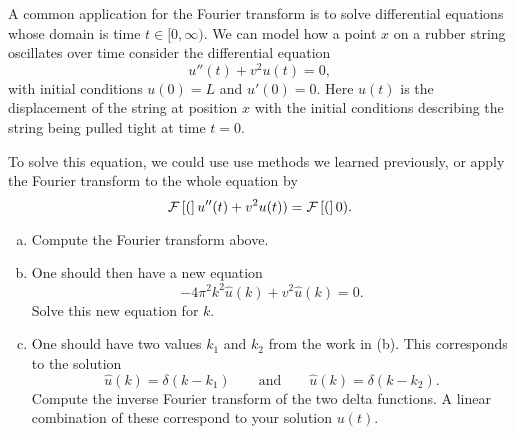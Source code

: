 \documentclass[12pt]{article} %
\begin{document}
%

\begin{problem}
A common application for the Fourier transform is to solve differential equations whose domain is time $t\in [0,\infty)$. We can model how a point $x$ on a rubber string oscillates over time consider the differential equation
\[
u''(t)+v^2u(t)=0,
\]
with initial conditions $u(0)=L$ and $u'(0)=0$. Here $u(t)$ is the displacement of the string at position $x$ with the initial conditions describing the string being pulled tight at time $t=0$.
\begin{figure}[H]
	\centering
	\def\svgwidth{\columnwidth}
	
\end{figure}
To solve this equation, we could use use methods we learned previously, or apply the Fourier transform to the whole equation by
\[
\mathcal{F}\left[ ( \right]u''(t)+v^2u(t))=\mathcal{F}\left[ ( \right]0).
\]
\begin{enumerate}[(a)]
	\item Compute the Fourier transform above.
	\item One should then have a new equation
	\[
	-4\pi^2k^2\hat{u}(k)+v^2\hat{u}(k)=0.
	\]
	Solve this new equation for $k$.
	\item One should have two values $k_1$ and $k_2$ from the work in (b).  This corresponds to the solution
	\[
	\hat{u}(k)=\delta(k-k_1) \qquad \textrm{and} \qquad \hat{u}(k)=\delta(k-k_2).
	\]
	Compute the inverse Fourier transform of the two delta functions. A linear combination of these correspond to your solution $u(t)$.
\end{enumerate}
\end{problem}
\end{document}
